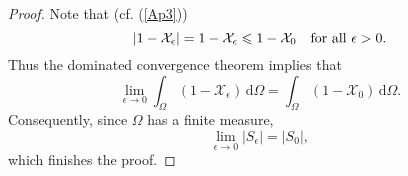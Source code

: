 \documentclass{imanum}
\begin{document}
\begin{proof}
Note that (cf. (\ref{Ap3}))
\begin{equation*}
|1-\mathcal{X}_\epsilon| = 1 - \mathcal{X}_\epsilon
\leq 1 - \mathcal{X}_0
\quad \hbox{for all}\ \epsilon > 0.
\end{equation*}
Thus the dominated convergence theorem
\citep[see, e.g.,][]{BRoy89}
implies that
\begin{equation*}
\lim_{\epsilon \rightarrow 0} \int_\Omega
(1-\mathcal{X}_\epsilon) \, \mathrm{d} \Omega
= \int_\Omega (1-\mathcal{X}_0) \, \mathrm{d} \Omega.
\end{equation*}
Consequently, since $\Omega$ has a finite measure,
\begin{equation*}
\lim_{\epsilon \rightarrow 0} |S_\epsilon| = |S_0|,
\end{equation*}
which finishes the proof.
\end{proof}
\end{document}
